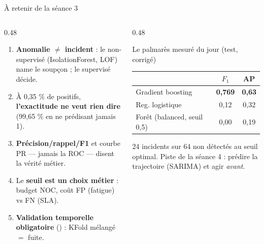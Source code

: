 \begin{frame}{À retenir de la séance 3}
\begin{columns}[t]
\begin{column}{0.48\textwidth}
\begin{kbox}
\begin{enumerate}
\item \textbf{Anomalie $\ne$ incident} : le non-supervisé
(IsolationForest, LOF) name le soupçon ; le supervisé décide.
\item À 0,35 \% de positifs, \textbf{l'exactitude ne veut
rien dire} (99,65 \% en ne prédisant jamais 1).
\item \textbf{Précision/rappel/F1} et courbe PR --- jamais la
ROC --- disent la vérité métier.
\item Le \textbf{seuil est un choix métier} : budget NOC,
coût FP (fatigue) vs FN (SLA).
\item \textbf{Validation temporelle obligatoire}
() : KFold mélangé $=$ fuite.
\end{enumerate}
\end{kbox}
\end{column}
\begin{column}{0.48\textwidth}
\begin{block}{Le palmarès mesuré du jour (test, corrigé)}
\begin{center}\small
\begin{tabular}{@{}l c c@{}}
\toprule
 & $F_1$ & AP\\
\midrule
Gradient boosting & \textbf{0,769} & \textbf{0,63}\\
Reg. logistique & 0,12 & 0,32\\
Forêt (balanced, seuil 0,5) & 0,00 & 0,19\\
\bottomrule
\end{tabular}
\end{center}
\end{block}
\begin{wbox}
24 incidents sur 64 non détectés au seuil optimal. Piste de la
séance 4 : prédire la trajectoire (SARIMA) et agir \emph{avant}.
\end{wbox}
\end{column}
\end{columns}
\end{frame}

